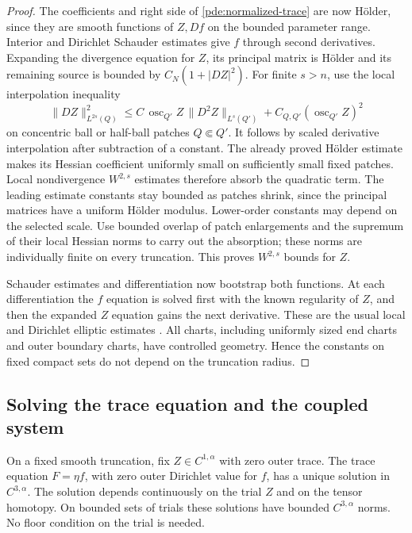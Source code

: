\begin{proof}
The coefficients and right side of
\eqref{pde:normalized-trace} are now H\"older, since they are smooth
functions of \(Z,Df\) on the bounded parameter range.  Interior and
Dirichlet Schauder estimates give \(f\) through second derivatives.
Expanding the divergence equation for \(Z\), its principal matrix is
H\"older and its remaining source is bounded by \(C_N(1+|DZ|^2)\).
For finite \(s>n\), use the local interpolation inequality
\begin{equation}
 \|DZ\|_{L^{2s}(Q)}^2
 \le C\,\operatorname{osc}_{Q'}Z\,\|D^2Z\|_{L^s(Q')}
       +C_{Q,Q'}(\operatorname{osc}_{Q'}Z)^2
 \label{pde:quadratic-interpolation}
\end{equation}
on concentric ball or half-ball patches \(Q\Subset Q'\).
It follows by scaled derivative interpolation after subtraction of
a constant.  The already proved H\"older estimate makes its Hessian
coefficient uniformly small on sufficiently small fixed patches.
Local nondivergence \(W^{2,s}\) estimates therefore absorb the
quadratic term.  The leading estimate constants stay bounded as
patches shrink, since the principal matrices have a uniform H\"older
modulus.  Lower-order constants may depend on the selected scale.
Use bounded overlap of patch enlargements and the supremum of their
local Hessian norms to carry out the absorption; these norms are
individually finite on every truncation.  This proves \(W^{2,s}\)
bounds for \(Z\).

Schauder estimates and differentiation now bootstrap both functions.
At each differentiation the \(f\) equation is solved first with the
known regularity of \(Z\), and then the expanded \(Z\) equation gains
the next derivative.  These are the usual local and Dirichlet
elliptic estimates \cite{GilbargTrudinger2001}.  All charts, including
uniformly sized end charts and outer boundary charts, have controlled
geometry.  Hence the constants on fixed compact sets do not depend
on the truncation radius.
\end{proof}

\subsection{Solving the trace equation and the coupled system}

\begin{lemma}
\label{pde:trial-trace}
On a fixed smooth truncation, fix \(Z\in C^{1,\alpha}\) with zero
outer trace.  The trace equation \(F=\eta f\), with zero outer
Dirichlet value for \(f\), has a unique solution in \(C^{3,\alpha}\).
The solution depends continuously on the trial \(Z\) and on the
tensor homotopy.  On bounded sets of trials these solutions have
bounded \(C^{3,\alpha}\) norms.  No floor condition on the trial
is needed.
\end{lemma}

